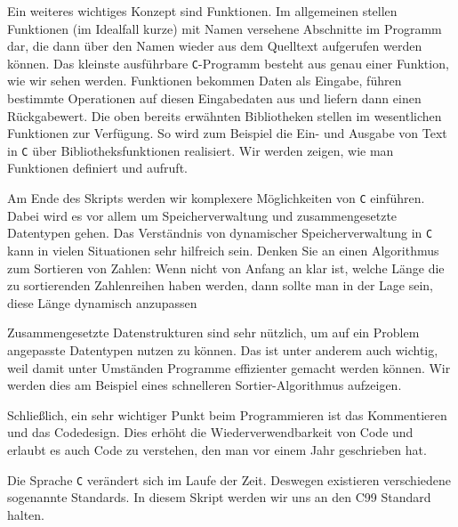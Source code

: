 Ein weiteres wichtiges Konzept sind Funktionen.
Im allgemeinen stellen Funktionen (im Idealfall kurze) mit Namen versehene Abschnitte im Programm dar, die dann über den Namen wieder aus dem Quelltext aufgerufen werden können.
Das kleinste ausführbare \texttt{C}-Programm besteht aus genau einer Funktion, wie wir sehen werden.
Funktionen bekommen Daten als Eingabe, führen bestimmte Operationen auf diesen Eingabedaten aus und liefern dann einen Rückgabewert.
Die oben bereits erwähnten Bibliotheken stellen im wesentlichen Funktionen zur Verfügung.
So wird zum Beispiel die Ein- und Ausgabe von Text in \texttt{C} über Bibliotheksfunktionen realisiert.
Wir werden zeigen, wie man Funktionen definiert und aufruft.

Am Ende des Skripts werden wir komplexere Möglichkeiten von \texttt{C} einführen.
Dabei wird es vor allem um Speicherverwaltung und zusammengesetzte Datentypen gehen.
Das Verständnis von dynamischer Speicherverwaltung in \texttt{C} kann in vielen Situationen sehr hilfreich sein.
Denken Sie an einen Algorithmus zum Sortieren von Zahlen: Wenn nicht von Anfang an klar ist, welche Länge die zu sortierenden Zahlenreihen haben werden, dann sollte man in der Lage sein, diese Länge dynamisch anzupassen

Zusammengesetzte Datenstrukturen sind sehr nützlich, um auf ein Problem angepasste Datentypen nutzen zu können. 
Das ist unter anderem auch wichtig, weil damit unter Umständen Programme effizienter gemacht werden können.
Wir werden dies am Beispiel eines schnelleren Sortier-Algorithmus aufzeigen.

Schließlich, ein sehr wichtiger Punkt beim Programmieren ist das Kommentieren und das Code\-design.
Dies erhöht die Wiederverwendbarkeit von Code und erlaubt es auch Code zu verstehen, den man vor einem Jahr geschrieben hat.

Die Sprache \texttt{C} verändert sich im Laufe der Zeit.
Deswegen existieren verschiedene sogenannte Standards.
In diesem Skript werden wir uns an den C99 Standard halten.

